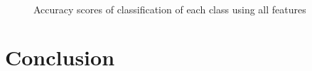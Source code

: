 \documentclass{llncs}
\begin{document}
\begin{figure}[!ht]
	\\
	\caption{Accuracy scores of classification of each class using all features}
	\label{fig::feature_union_results}
\end{figure}

\section{Conclusion}
\end{document}
